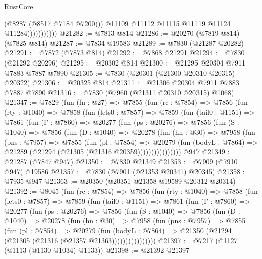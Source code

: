\begin{lexlean}{RustCore}
\begin{coremodule}
                            (@8287 (@8517 @7184 @7200)))
                          @11109
                          @11112
                          @11115
                          @11119
                          @11124
                          @11284)))))))))))
@21282 := @7813 @814
@21286 := @20270 (@7819 @814) (@7825 @814)
@21287 := @7834 @19583
@21289 := @7830 (@21287 @20282)
@21291 := @7872 (@7873 @814)
@21292 := @7868 @21291
@21294 := @7830 (@21292 @20296)
@21295 := @20302 @814
@21300 := @21295 @20304 @7911 @7883 @7887 @7890
@21305 := @7830 (@20301 (@21300 @20310 @20315) @20322)
@21306 := @20325 @814
@21311 := @21306 @20304 @7911 @7883 @7887 @7890
@21316 := @7830 (@7960 (@21311 @20310 @20315) @1068)
@21347 := @7829
    (fun (fn : @27) =>
    @7855
      (fun (rc : @7854) =>
      @7856
        (fun (rty : @1040) =>
        @7858
          (fun (lets0 : @7857) =>
          @7859
            (fun (tail0 : @1151) =>
            @7861
              (fun (Γ : @7860) =>
              @20277
                (fun (ps : @20276) =>
                @7856
                  (fun (S : @1040) =>
                  @7856
                    (fun (D : @1040) =>
                    @20278
                      (fun (hn : @30) =>
                      @7958
                        (fun (pns : @7957) =>
                        @7855
                          (fun (pl : @7854) =>
                          @20279
                            (fun (bodyL : @7864) =>
                            @21289 (@21294 (@21305 (@21316 @20359))))))))))))))))
    @947
@21349 := @21287 (@7847 @947)
@21350 := @7830 @21349
@21353 := @7909 (@7910 @947) @19586
@21357 := @7830 (@7901 (@21353 @20341) @20345)
@21358 := @7935 @947
@21363 := @20350 (@20351 @21358 @19589 @20312 @20314)
@21392 := @8045
    (fun (rc : @7854) =>
    @7856
      (fun (rty : @1040) =>
      @7858
        (fun (lets0 : @7857) =>
        @7859
          (fun (tail0 : @1151) =>
          @7861
            (fun (Γ : @7860) =>
            @20277
              (fun (ps : @20276) =>
              @7856
                (fun (S : @1040) =>
                @7856
                  (fun (D : @1040) =>
                  @20278
                    (fun (hn : @30) =>
                    @7958
                      (fun (pns : @7957) =>
                      @7855
                        (fun (pl : @7854) =>
                        @20279
                          (fun (bodyL : @7864) =>
                          @21350 (@21294 (@21305 (@21316 (@21357 @21363))))))))))))))))
@21397 := @7217 (@1127 (@1113 (@1130 @1034) @1133))
@21398 := @21392 @21397

\end{coremodule}
\end{lexlean}
